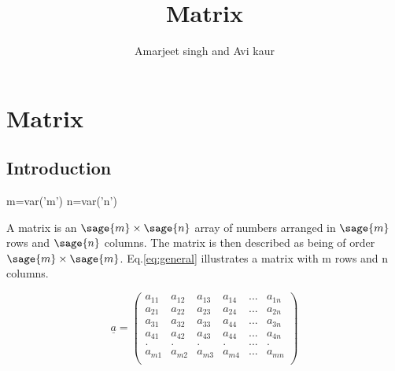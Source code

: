 \documentclass[12pt]{report}
\title{Matrix}
\author{Amarjeet singh and Avi kaur}
\newcommand{\lab}[1]{
	Eq.\ref{#1}
}
\begin{document}
\thispagestyle{plain}
	\begin{titlepage}
\maketitle
	\end{titlepage}
	\chapter{Matrix}
	\section{Introduction}
	\begin{sagesilent}
		m=var('m')
		n=var('n')
	\end{sagesilent}

A matrix is an $\sage{m} \times \sage{n}$ 
array of numbers arranged in $\sage{m}$ rows and $\sage{n}$ columns.
The matrix is then described as being of order 
$\sage{m} \times \sage{m}$. \lab{eq:general} illustrates a matrix with m rows and n columns.


\begin{equation}
	\underline{a}=\left(\begin{array}{rrrrrr}
		a_{11} & a_{12} & a_{13} & a_{14} & ... & a_{1n} \\
		a_{21} & a_{22} & a_{23} & a_{24} & ... & a_{2n} \\
		a_{31} & a_{32} & a_{33} & a_{44} & ... & a_{3n} \\
		a_{41} & a_{42} & a_{43} & a_{44} & ... & a_{4n} \\
		.     & .     & .     & .     & ... & .     \\
		a_{m1} & a_{m2} & a_{m3} & a_{m4} & ... & a_{mn} \\
	\end{array}\right) \label{eq:general}          
\end{equation}
\end{document}
